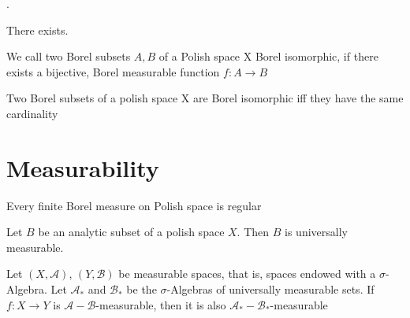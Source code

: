 \documentclass[10pt, a4paper, titlepage]{article}
\numberwithin{equation}{section}
\begin{document}
\begin{theorem}
	.
\end{theorem}

\begin{theorem}
	There exists.
\end{theorem}

\begin{definition}
	We call two Borel subsets $A,B$ of a Polish space X Borel isomorphic, if there exists a bijective, Borel measurable function $f: A \to B$
\end{definition}


\begin{theorem}
	Two Borel subsets of a polish space X are Borel isomorphic iff they have the same cardinality
\end{theorem}




\section{Measurability}

\begin{definition}[$\mu$-Measurable]
	
\end{definition}

\begin{definition}
	
\end{definition}

\begin{theorem}
	Every finite Borel measure on Polish space is regular
\end{theorem}

\begin{theorem}
	Let $B$ be an analytic subset of a polish space $X$. Then $B$ is universally measurable.
\end{theorem}

\begin{theorem}
	Let $(X,\mathcal{A})$,  $\left( Y, \mathcal{B} \right) $ be measurable spaces, that is, spaces endowed with a $\sigma$-Algebra.  
	Let $\mathcal{A}_*$ and $\mathcal{B}_*$ be the $\sigma$-Algebras of universally measurable sets.
	If  $f:X \to Y$ is  $\mathcal{A}- \mathcal{B}$-measurable, then it is also $\mathcal{A}_*-\mathcal{B}_*$-measurable
\end{theorem}
\end{document}
